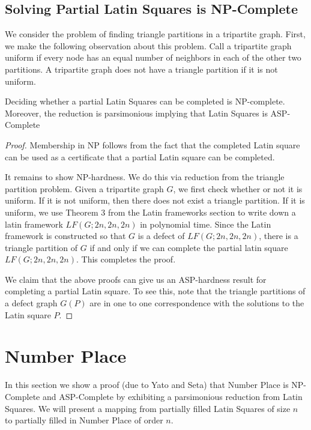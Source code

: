 \documentclass[runningheads,a4paper]{llncs}
\begin{document}
\subsection{Solving Partial Latin Squares is NP-Complete}

We consider the problem of finding triangle partitions in a tripartite graph. First, we make the following observation about this problem. Call a tripartite graph uniform if every node has an equal number of neighbors in each of the other two partitions. A tripartite graph does not have a triangle partition if it is not uniform.

\begin{theorem}
Deciding whether a partial Latin Squares can be completed is NP-complete. Moreover, the reduction is parsimonious implying that Latin Squares is ASP-Complete
\end{theorem}

\begin{proof}
Membership in NP follows from the fact that the completed Latin square can be used as a certificate that a partial Latin square can be completed.

It remains to show NP-hardness. We do this via reduction from the triangle partition problem. Given a tripartite graph $G$, we first check whether or not it is uniform. If it is not uniform, then there does not exist a triangle partition. If it is uniform, we use Theorem 3 from the Latin frameworks section to write down a latin framework $LF(G;2n,2n,2n)$ in polynomial time. Since the Latin framework is constructed so that $G$ is a defect of $LF(G;2n,2n,2n)$, there is a triangle partition of $G$ if and only if we can complete the partial latin square $LF(G;2n,2n,2n)$. This completes the proof.

We claim that the above proofs can give us an ASP-hardness result for completing a partial Latin square. To see this, note that the triangle partitions of a defect graph $G(P)$ are in one to one correspondence with the solutions to the Latin square $P$.

\end{proof}

\section{Number Place}

In this section we show  a proof (due to Yato and Seta) that Number Place is NP-Complete and ASP-Complete by exhibiting a parsimonious reduction from Latin Squares. We will present a mapping from partially filled Latin Squares of size $n$ to partially filled in Number Place of order $n$.
\end{document}

